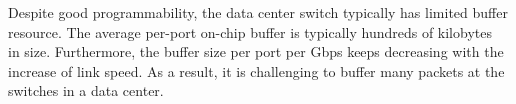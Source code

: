 Despite good programmability, the data center switch typically has limited buffer resource.
The average per-port on-chip buffer is typically hundreds of kilobytes~\cite{bai2017congestion} in size.
Furthermore, the buffer size per port per Gbps keeps decreasing with the increase of link speed.
As a result, it is challenging to buffer many packets at the switches in a data center.








